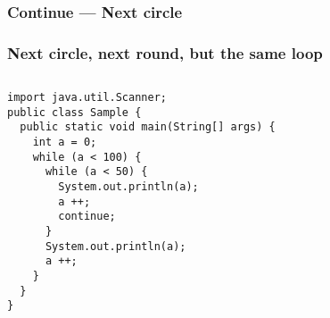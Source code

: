 \documentclass[en, 11pt, xcolor=dvipsnames]{beamer}
\begin{document}
\subsubsection{Continue --- Next circle}
\begin{frame}[fragile]
	\frametitle{Next circle, next round, but the same loop}



	\begin{columns}[c]
		\begin{column}{0.9\textwidth}

			\begin{lstlisting}[style=Java]
import java.util.Scanner;
public class Sample {
  public static void main(String[] args) {
    int a = 0;
    while (a < 100) {
      while (a < 50) {
        System.out.println(a);
        a ++;
        continue;
      }
      System.out.println(a);
      a ++;
    }
  }
}\end{lstlisting}

		\end{column}
	\end{columns}

\end{frame}
\end{document}
